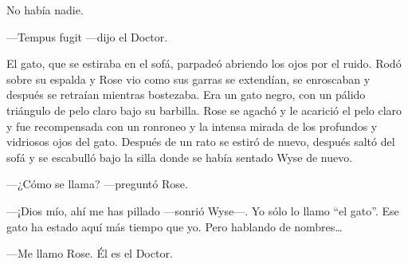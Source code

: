 {No había nadie.}

{---Tempus fugit ---dijo el Doctor.}

{El gato, que se
	estiraba en el sofá, parpadeó abriendo los ojos por el ruido. Rodó sobre
	su espalda y Rose vio como sus garras se extendían, se enroscaban y
	después se retraían mientras bostezaba. Era un gato negro, con un pálido
	triángulo de pelo claro bajo su barbilla. Rose se agachó y le acarició
	el pelo claro y fue recompensada con un ronroneo y la intensa mirada de
	los profundos y vidriosos ojos del gato. Después de un rato se estiró de
	nuevo, después saltó del sofá y se escabulló bajo la silla donde se
había sentado Wyse de nuevo.}

{---¿Cómo se llama? ---preguntó Rose.}

{---¡Dios mío, ahí me has pillado ---sonrió Wyse---. Yo sólo lo llamo
	``el gato''. Ese gato ha estado aquí más tiempo que yo. Pero hablando de
	nombres\ldots{}}

{---Me llamo Rose. Él es el Doctor.}

